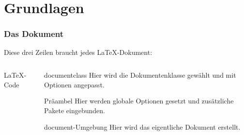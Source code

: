 \section{Grundlagen}

\begin{frame}[fragile]
    \frametitle{Das Dokument}
    Diese drei Zeilen braucht jedes \LaTeX-Dokument:
    \begin{columns}[T]
        \begin{column}{0.47\textwidth}
            \begin{block}{\LaTeX-Code}
            \end{block}
        \end{column}
        \begin{column}{0.47\textwidth}
            \begin{block}{documentclass}
                Hier wird die Dokumentenklasse gewählt und mit Optionen angepasst. \\
            \end{block}
            \begin{block}{Präambel}
                Hier werden globale Optionen gesetzt und zusätzliche Pakete eingebunden.\\
            \end{block}
            \begin{block}{document-Umgebung}
                Hier wird das eigentliche Dokument erstellt.
            \end{block}
        \end{column}
    \end{columns}
\end{frame}

